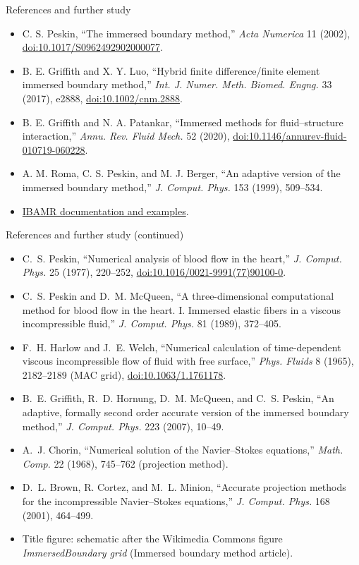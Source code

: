 \documentclass[aspectratio=169,11pt]{beamer}
\begin{document}
\begin{frame}{References and further study}
\begin{itemize}\itemsep6pt
  \item C. S. Peskin, ``The immersed boundary method,'' \emph{Acta Numerica} 11 (2002),
  \href{https://doi.org/10.1017/S0962492902000077}{doi:10.1017/S0962492902000077}.
  \item B. E. Griffith and X. Y. Luo, ``Hybrid finite difference/finite element immersed boundary method,'' \emph{Int. J. Numer. Meth. Biomed. Engng.} 33 (2017), e2888,
  \href{https://doi.org/10.1002/cnm.2888}{doi:10.1002/cnm.2888}.
  \item B. E. Griffith and N. A. Patankar, ``Immersed methods for fluid--structure interaction,'' \emph{Annu. Rev. Fluid Mech.} 52 (2020),
  \href{https://doi.org/10.1146/annurev-fluid-010719-060228}{doi:10.1146/annurev-fluid-010719-060228}.
  \item A. M. Roma, C. S. Peskin, and M. J. Berger, ``An adaptive version of the immersed boundary method,'' \emph{J. Comput. Phys.} 153 (1999), 509--534.
  \item \href{https://ibamr.github.io/}{IBAMR documentation and examples}.
\end{itemize}
\end{frame}

\begin{frame}{References and further study (continued)}
\footnotesize
\begin{itemize}\itemsep3pt
  \item C.~S. Peskin, ``Numerical analysis of blood flow in the heart,'' \emph{J. Comput. Phys.} 25 (1977), 220--252,
  \href{https://doi.org/10.1016/0021-9991(77)90100-0}{doi:10.1016/0021-9991(77)90100-0}.
  \item C.~S. Peskin and D.~M. McQueen, ``A three-dimensional computational method for blood flow in the heart. I. Immersed elastic fibers in a viscous incompressible fluid,'' \emph{J. Comput. Phys.} 81 (1989), 372--405.
  \item F.~H. Harlow and J.~E. Welch, ``Numerical calculation of time-dependent viscous incompressible flow of fluid with free surface,'' \emph{Phys. Fluids} 8 (1965), 2182--2189 (MAC grid),
  \href{https://doi.org/10.1063/1.1761178}{doi:10.1063/1.1761178}.
  \item B.~E. Griffith, R.~D. Hornung, D.~M. McQueen, and C.~S. Peskin, ``An adaptive, formally second order accurate version of the immersed boundary method,'' \emph{J. Comput. Phys.} 223 (2007), 10--49.
  \item A.~J. Chorin, ``Numerical solution of the Navier--Stokes equations,'' \emph{Math. Comp.} 22 (1968), 745--762 (projection method).
  \item D.~L. Brown, R. Cortez, and M.~L. Minion, ``Accurate projection methods for the incompressible Navier--Stokes equations,'' \emph{J. Comput. Phys.} 168 (2001), 464--499.
  \item Title figure: schematic after the Wikimedia Commons figure \emph{ImmersedBoundary grid} (Immersed boundary method article).
\end{itemize}
\end{frame}
\end{document}
